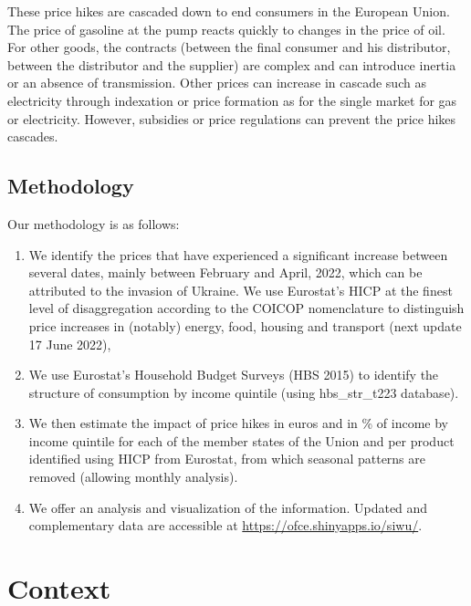 \documentclass[
  9pt,
  a4paper,
  DIV=11,
  numbers=noendperiod,
  oneside]{scrartcl}
\providecommand{\tightlist}{%
  \setlength{\itemsep}{0pt}\setlength{\parskip}{0pt}}\usepackage{longtable,booktabs,array}
\begin{document}
These price hikes are cascaded down to end consumers in the European
Union. The price of gasoline at the pump reacts quickly to changes in
the price of oil. For other goods, the contracts (between the final
consumer and his distributor, between the distributor and the supplier)
are complex and can introduce inertia or an absence of transmission.
Other prices can increase in cascade such as electricity through
indexation or price formation as for the single market for gas or
electricity. However, subsidies or price regulations can prevent the
price hikes cascades.

\hypertarget{methodology}{%
\subsection{Methodology}\label{methodology}}

Our methodology is as follows:

\begin{enumerate}
\def\labelenumi{\arabic{enumi}.}
\tightlist
\item
  We identify the prices that have experienced a significant increase
  between several dates, mainly between February and April, 2022, which
  can be attributed to the invasion of Ukraine. We use Eurostat's HICP
  at the finest level of disaggregation according to the COICOP
  nomenclature to distinguish price increases in (notably) energy, food,
  housing and transport (next update 17 June 2022),
\item
  We use Eurostat's Household Budget Surveys (HBS 2015) to identify the
  structure of consumption by income quintile (using hbs\_str\_t223
  database).
\item
  We then estimate the impact of price hikes in euros and in \% of
  income by income quintile for each of the member states of the Union
  and per product identified using HICP from Eurostat, from which
  seasonal patterns are removed (allowing
  monthly analysis).
\item
  We offer an analysis and visualization of the information. Updated and
  complementary data are accessible at
  \url{https://ofce.shinyapps.io/siwu/}.
\end{enumerate}

\hypertarget{context}{%
\section{Context}\label{context}}
\end{document}
